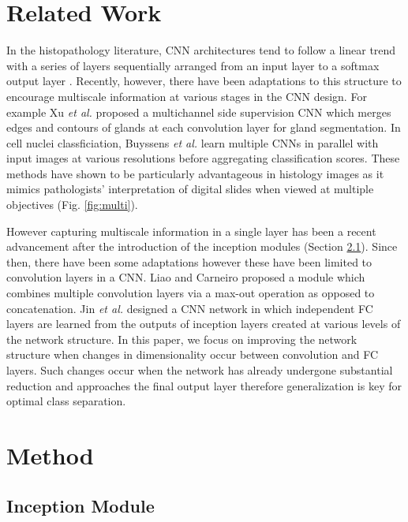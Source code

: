 \documentclass[runningheads,a4paper]{llncs}
\def\etal{\emph{et al. }}
\begin{document}
\section{Related Work}

In the histopathology literature, CNN architectures tend to follow a linear trend with a series of layers sequentially arranged from an input layer to a softmax output layer \cite{Spanhol2016,Litjens2016}. Recently, however, there have been adaptations to this structure to encourage multiscale information at various stages in the CNN design. For example Xu \etal \cite{Xu2016} proposed a multichannel side supervision CNN which merges edges and contours of glands at each convolution layer for gland segmentation. In cell nuclei classficiation, Buyssens \etal \cite{Buyssens2013} learn multiple CNNs in parallel with input images at  various resolutions before aggregating classification scores. These methods have shown to be particularly advantageous in histology images as it mimics pathologists' interpretation of digital slides when viewed at multiple objectives (Fig. \ref{fig:multi}).

However capturing multiscale information in a single layer has been a recent advancement after the introduction of the inception modules (Section \ref{sec:inceptiondesc}). Since then, there have been some adaptations however these have been limited to convolution layers in a CNN. Liao and Carneiro \cite{Liao2015} proposed a module which combines multiple convolution layers via a max-out operation as opposed to concatenation. Jin \etal \cite{Jin2016} designed a CNN network in which independent FC layers are learned from the outputs of inception layers created at various levels of the network structure. In this paper, we focus on improving the network structure when changes in dimensionality occur between convolution and FC layers. Such changes occur when the network has already undergone substantial reduction and approaches the final output layer therefore generalization is key for optimal class separation.


\section{Method}

\subsection{Inception Module}
\label{sec:inceptiondesc}
\end{document}

